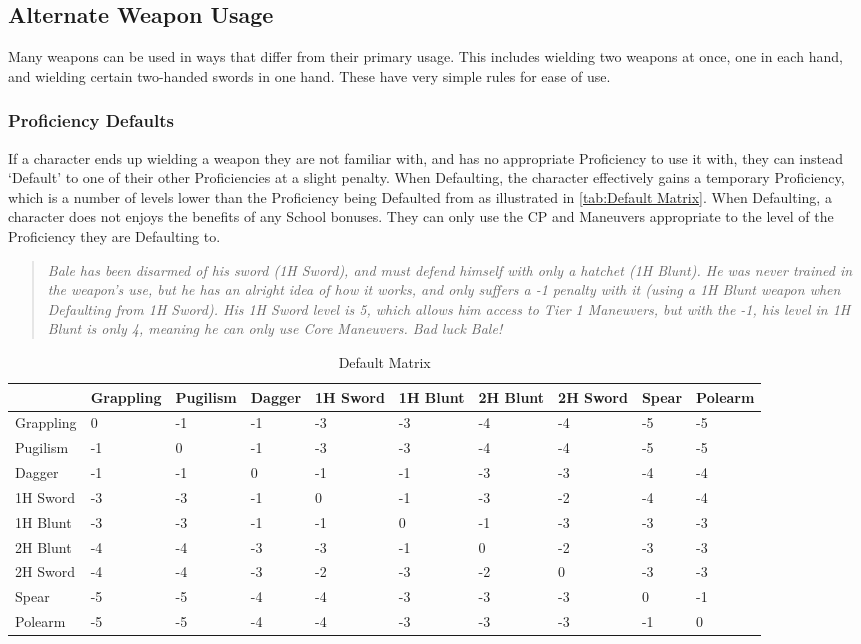 \documentclass[oneside,11pt,english]{book}
\begin{document}
\subsection{Alternate Weapon Usage}
Many weapons can be used in ways that differ from their primary usage. This includes wielding two 
weapons at once, one in each hand, and wielding certain two-handed swords in one hand. These have very 
simple rules for ease of use. 

\subsubsection{Proficiency Defaults}
If a character ends up wielding a weapon they are not familiar with, and has no appropriate Proficiency to 
use it with, they can instead ‘Default’ to one of their other Proficiencies at a slight penalty. When 
Defaulting, the character effectively gains a temporary Proficiency, which is a number of levels lower 
than the Proficiency being Defaulted from as illustrated in \autoref{tab:Default Matrix}. When Defaulting, a character does 
not enjoys the benefits of any School bonuses. They can only use the CP and Maneuvers appropriate to 
the level of the Proficiency they are Defaulting to. 

\begin{quote}
	\emph{Bale has been disarmed of his sword (1H Sword), and must defend himself with only a hatchet (1H Blunt). He was never trained in the weapon’s use, but he has an alright idea of how it works, and only suffers a -1 penalty with it (using a 1H Blunt weapon when Defaulting from 1H Sword). His 1H Sword level is 5, which allows him access to Tier 1 Maneuvers, but with the -1, his level in 1H Blunt is only 4, meaning he can only use Core Maneuvers. Bad luck Bale! }
\end{quote}

\begin{table}
	\centering
	\caption{Default Matrix}
	\label{tab:Default Matrix}
	\begin{tabu} spread 0pt {*{10}{X[-1,c]}}
		&Grappling &Pugilism &Dagger &1H Sword &1H Blunt &2H Blunt &2H Sword &Spear &Polearm\\\toprule
		Grappling &0 &-1 &-1 &-3 &-3 &-4 &-4 &-5 &-5\\
		Pugilism &-1 &0 &-1 &-3 &-3 &-4 &-4 &-5 &-5\\
		Dagger &-1 &-1 &0 &-1 &-1 &-3 &-3 &-4 &-4\\
		1H Sword &-3 &-3 &-1 &0 &-1 &-3 &-2 &-4 &-4\\
		1H Blunt &-3 &-3 &-1 &-1 &0 &-1 &-3 &-3 &-3\\
		2H Blunt &-4 &-4 &-3 &-3 &-1 &0 &-2 &-3 &-3\\
		2H Sword &-4 &-4 &-3 &-2 &-3 &-2 &0 &-3 &-3\\
		Spear &-5 &-5 &-4 &-4 &-3 &-3 &-3 &0 &-1\\
		Polearm &-5 &-5 &-4 &-4 &-3 &-3 &-3 &-1 &0\\
	\end{tabu}
\end{table}
\end{document}
